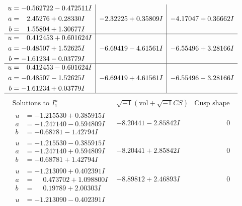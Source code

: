 \documentclass[1p]{elsarticle_modified}
\theoremstyle{definition}
\newcommand{\I}{\sqrt{-1}}
\begin{document}
$$\begin{array}{c|c|c}
\begin{aligned}
u &= -0.562722 - 0.472511 I \\
a &= \phantom{-}2.45276 + 0.28330 I \\
b &= \phantom{-}1.55804 + 1.30677 I\end{aligned}
 & -2.32225 + 0.35809 I & -4.17047 + 0.36662 I \\ \hline\begin{aligned}
u &= \phantom{-}0.412453 + 0.601624 I \\
a &= -0.48507 + 1.52625 I \\
b &= -1.61234 - 0.03779 I\end{aligned}
 & -6.69419 - 4.61561 I & -6.55496 + 3.28166 I \\ \hline\begin{aligned}
u &= \phantom{-}0.412453 - 0.601624 I \\
a &= -0.48507 - 1.52625 I \\
b &= -1.61234 + 0.03779 I\end{aligned}
 & -6.69419 + 4.61561 I & -6.55496 - 3.28166 I\\
 \hline 
 \end{array}$$\newpage$$\begin{array}{c|c|c}  
\text{Solutions to }I^u_{1}& \I (\text{vol} + \sqrt{-1}CS) & \text{Cusp shape}\\
 \hline 
\begin{aligned}
u &= -1.215530 + 0.385915 I \\
a &= -1.247140 - 0.594809 I \\
b &= -0.68781 - 1.42794 I\end{aligned}
 & -8.20441 - 2.85842 I & \phantom{-0.000000 } 0 \\ \hline\begin{aligned}
u &= -1.215530 - 0.385915 I \\
a &= -1.247140 + 0.594809 I \\
b &= -0.68781 + 1.42794 I\end{aligned}
 & -8.20441 + 2.85842 I & \phantom{-0.000000 } 0 \\ \hline\begin{aligned}
u &= -1.213090 + 0.402391 I \\
a &= \phantom{-}0.473702 + 1.098800 I \\
b &= \phantom{-}0.19789 + 2.00303 I\end{aligned}
 & -8.89812 + 2.46893 I & \phantom{-0.000000 } 0 \\ \hline\begin{aligned}
u &= -1.213090 - 0.402391 I \\

\end{aligned}
\end{array}$$
\end{document}

